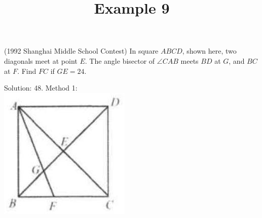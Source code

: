 \documentclass{article}
\title{Example 9}
\date{}
\begin{document}
\maketitle

(1992 Shanghai Middle School Contest) In square \(A B C D\), shown here, two diagonals meet at point \(E\). The angle bisector of \(\angle C A B\) meets \(B D\) at \(G\), and \(B C\) at \(F\). Find \(F C\) if \(G E=24\).

Solution: 48.
Method 1:\\
\centering
\includegraphics[width=\textwidth]{images/109(2).jpg}
\end{document}
